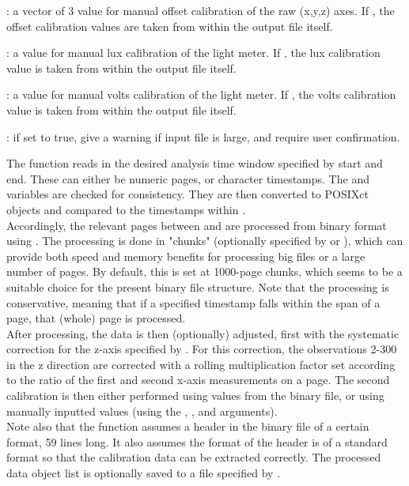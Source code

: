 \documentclass[a4paper]{book}
\begin{document}
\begin{Arguments}
\begin{ldescription}
: a vector of 3 value for manual offset calibration of the raw (x,y,z) axes.  If , the offset calibration values are taken from within the output file itself.\\{}

: a value for manual lux calibration of the light meter.  If , the lux calibration value is taken from within the output file itself.\\{}

: a value for manual volts calibration of the light meter.  If , the volts calibration value is taken from within the output file itself.\\{}

: if set to true, give a warning if input file is large, and require user confirmation.


\end{ldescription}
\end{Arguments}
%
\begin{Details}\relax
The function reads in the desired analysis time window specified by start and end.  These can either be numeric pages, or character timestamps.  The  and  variables are checked for consistency.  They are then converted to POSIXct objects and compared to the timestamps within .  \\{} Accordingly, the relevant pages between  and  are processed from binary format using .  The processing is done in "chunks" (optionally specified by  or ), which can provide both speed and memory benefits for processing big files or a large number of pages.  By default, this is set at 1000-page chunks, which seems to be a suitable choice for the present binary file structure. Note that the processing is conservative, meaning that if a specified timestamp falls within the span of a page, that (whole) page is processed.  \\{} After processing, the data is then (optionally) adjusted, first with the systematic correction for the z-axis specified by .  For this correction, the observations 2-300 in the z direction are corrected with a rolling multiplication factor set according to the ratio of the first and second x-axis measurements on a page.  The second calibration is then either performed using values from the binary file, or using manually inputted values (using the , , and  arguments).  \\{} Note also that the function assumes a header in the binary file of a certain format, 59 lines long.  It also assumes the format of the header is of a standard format so that the calibration data can be extracted correctly.  The processed data object list is optionally saved to a file specified by .
\end{Details}
\end{document}
